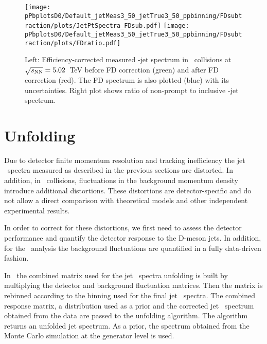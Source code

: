 \begin{figure}[bth]
\centering
\texttt{[image: pPbplotsD0/Default\_jetMeas3\_50\_jetTrue3\_50\_ppbinning/FDsubtraction/plots/JetPtSpectra\_FDsub.pdf]}
\texttt{[image: pPbplotsD0/Default\_jetMeas3\_50\_jetTrue3\_50\_ppbinning/FDsubtraction/plots/FDratio.pdf]}
\caption{Left: Efficiency-corrected measured \Dzero-jet spectrum in \pPb\ collisions at $\sqrt{s_{\rm NN}}=5.02$~TeV before FD correction (green) and after FD correction (red). The FD spectrum is also plotted (blue) with its uncertainties. Right plot shows ratio of non-prompt to inclusive \Dzero-jet spectrum.}
\label{fig:pPbFD_corr_Dzero}
\end{figure}



\section{Unfolding}
\label{sect:unfResults}

Due to detector finite momentum resolution and tracking inefficiency the jet \pt\ spectra measured as described
in the previous sections are distorted. In addition, in \pPb\ collisions, fluctuations in the background momentum density
introduce additional distortions. These distortions are detector-specific and do not allow a direct comparison
with theoretical models and other independent experimental results.

In order to correct for these distortions, we first need to assess the detector performance and quantify
the detector response to the D-meson jets. In addition, for the \pPb\ analysis the background fluctuations are quantified in a
fully data-driven fashion.

In \pPb\ the combined matrix used for the jet \pt\ spectra unfolding is built by multiplying the detector and background fluctuation matrices.
Then the matrix is rebinned according to the binning used for the final jet \pt\ spectra. The combined response matrix, a distribution used as a prior and the corrected jet \pt\ spectrum obtained from the data are passed to the unfolding algorithm. The algorithm returns an unfolded jet \pt spectrum. As a prior, the spectrum obtained from the Monte Carlo simulation at the generator level is used.

